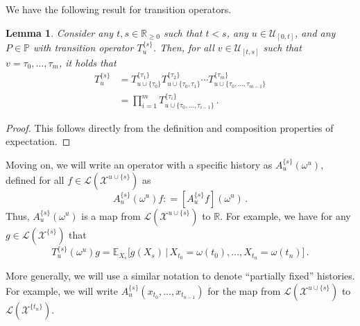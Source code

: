\documentclass[a4paper,reqno]{amsart}
\newtheorem{lemma}[theorem]{Lemma}
\newcommand{\reals}{\mathbb{R}}
\newcommand{\realsnonneg}{\reals_{\geq 0}}
\newcommand{\states}{\mathcal{X}}
\newcommand{\gambles}{\mathcal{L}}
\newcommand{\coloneqq}{:\!=}
\begin{document}
We have the following result for transition operators.
\begin{lemma}\label{lemma:nonmarkov_transition_decompose}
Consider any $t,s\in\realsnonneg$ such that $t<s$, any $u\in\mathcal{U}_{[0,t]}$, and any $P\in\mathbb{P}$ with transition operator $T_u^{\{s\}}$. Then, for all $v\in\mathcal{U}_{[t,s]}$ such that $v= \tau_0,\ldots,\tau_m$, it holds that
\begin{align*}
T_u^{\{s\}} &= T_{u\cup\{\tau_0\}}^{\{\tau_1\}}T_{u\cup\{\tau_0,\tau_1\}}^{\{\tau_2\}}\cdots T_{u\cup\{\tau_0,\ldots,\tau_{m-1}\}}^{\{\tau_m\}} \\
 &= \prod_{i=1}^{m} T_{u\cup\{\tau_0,\ldots,\tau_{i-1}\}}^{\{\tau_i\}}\,.
\end{align*}
\end{lemma}
\begin{proof}
This follows directly from the definition and composition properties of expectation.
\end{proof}

Moving on, we will write an operator with a specific history as $A_u^{\{s\}}(\omega^u)$, defined for all $f\in\gambles(\states^{u\cup\{s\}})$ as
\begin{equation*}
A_u^{\{s\}}(\omega^u)f \coloneqq \left[A_u^{\{s\}}f\right](\omega^u)\,.
\end{equation*}
Thus, $A_u^{\{s\}}(\omega^u)$ is a map from $\gambles(\states^{u\cup\{s\}})$ to $\mathbb{R}$. For example, we have for any $g\in\gambles(\states^{\{s\}})$ that
\begin{equation*}
T_u^{\{s\}}(\omega^u)g = \mathbb{E}_{X_s}\bigl[g(X_s)\,\vert\,X_{t_0}=\omega(t_0),\ldots,X_{t_n}=\omega(t_n)\bigr]\,.
\end{equation*}

More generally, we will use a similar notation to denote ``partially fixed'' histories. For example, we will write $A_u^{\{s\}}(x_{t_0},\ldots,x_{t_{n-1}})$ for the map from $\gambles(\states^{u\cup\{s\}})$ to $\gambles(\states^{\{t_n\}})$. 
\end{document}
